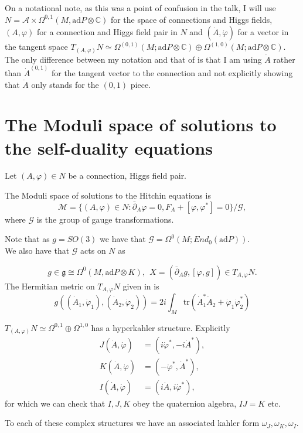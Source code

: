 On a notational note, as this was a point of confusion in the talk, I will use $N=\mathcal{A}\times  \Omega^{0,1}(M,\text{ad}P\otimes \mathbb{C})$ for the space of connections and Higgs fields, $(A,\varphi)$ for a connection and Higgs field pair in $N$ and $(\dot{A},\dot{\varphi})$ for a vector in the tangent space $T_{(A,\varphi)}N\simeq \Omega^{(0,1)}(M;\text{ad}P\otimes \mathbb{C})\oplus \Omega^{(1,0)}(M;\text{ad}P\otimes \mathbb{C})$. The only difference between my notation and that of \cite{Hitchin} is that I am using $\dot{A}$ rather than $\dot{A}^{(0,1)}$ for the tangent vector to the connection and not explicitly showing that $\dot{A}$ only stands for the $(0,1)$ piece. 




\section{The Moduli space of solutions to the self-duality equations}
Let $ ( A , \varphi) \in N$ be a connection, Higgs field pair.
\begin{definition} The Moduli space of solutions to the Hitchin equations is
\begin{equation}
    \mathcal{M} = \{ ( A, \varphi) \in N: \bar{\partial} _A \varphi = 0 , F_A + [\varphi, \varphi^*] = 0 \} / \mathcal{G},
\end{equation}
where $\mathcal{G}$ is the group of gauge transformations.
\end{definition} 
Note that as $g=SO(3)$ we have that $\mathcal{G}=\Omega^{0}(M;End_{0}(\text{ad}P))$.\\
We also have that $\mathcal{G} $ acts on $N$  as

\begin{equation}
    g \in \mathfrak{g} \cong \Omega^0 (M, \mathrm{ad}P \otimes K ) ,~~ X=( \bar{\partial}_A g, [\varphi, g]) \in T_{A, \varphi} N.
\end{equation}
The Hermitian metric on $T_{A, \varphi} N$ given in \cite{Hitchin} is
\begin{equation}
    g((\dot{A}_1, \dot{\varphi}_1) , (\dot{A}_2, \dot{\varphi}_2)) = 2i \int _M \mathrm{tr} ( \dot{A}_1 ^* \dot{A}_2 + \dot{\varphi}_1 \dot{\varphi}_2 ^* ) 
\end{equation}

\begin{remark}
$T_{(A,\varphi)}N\simeq \Omega^{0,1} \oplus \Omega^{1,0} $ has a hyperkahler structure. 
Explicitly 
\begin{align}
    J(\dot{A}, \dot{\varphi}) & = (i \dot{\varphi}^*, -i \dot{A}^*) ,\\ 
    K(\dot{A}, \dot{\varphi}) & = (- \dot{\varphi}^*, \dot{A}^*), \\ 
    I(\dot{A}, \dot{\varphi}) & = (i \dot{A}, i \dot{\varphi}^*) ,
\end{align}
for which we can check that $I,J,K$ obey the quaternion algebra, $IJ=K$ etc.
\end{remark}
To each of these complex structures we have an associated kahler form $\omega_J, \omega_K, \omega_I$.

